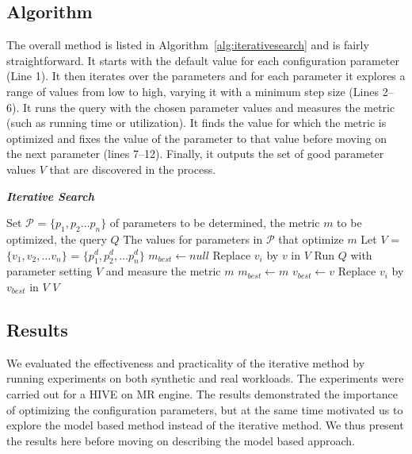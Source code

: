 \subsection{Algorithm}
The overall method is listed in Algorithm~\ref{alg:iterativesearch} and is fairly straightforward. It starts with the default value for each configuration parameter (Line 1). It then iterates over the parameters and for each parameter it explores a range of values from low to high, varying it with a minimum step size (Lines 2--6). It runs the query with the chosen parameter values and measures the metric (such as running time or utilization). It finds the value for which the metric is optimized and fixes the value of the parameter to that value before moving on the next parameter (lines 7--12). Finally, it outputs the set of good parameter values $V$ that are discovered in the process.
\renewcommand{\algorithmicrequire}{\textbf{Input:}}
\renewcommand{\algorithmicensure}{\textbf{Output:}}
\renewcommand{\algorithmiccomment}[1]{// #1}
\begin{algorithm}[h]
	\caption{\bf \textit{Iterative Search}}
	\label{alg:iterativesearch}
	\begin{algorithmic}[1]
		\footnotesize
		\REQUIRE Set $\mathcal{P}$ = $\{p_1, p_2 \ldots p_n\}$ of parameters to be determined, the metric $m$ to be optimized, the query $Q$
		\ENSURE The values for parameters in $\mathcal{P}$ that optimize $m$
		\STATE Let $V$ = $\{v_1, v_2, \ldots v_n\}$ = $\{p_1^d, p_2^d, \ldots p_n^d\}$
			\STATE $m_{best} \gets null$
				\STATE Replace $v_i$ by $v$ in $V$
				\STATE Run $Q$ with parameter setting $V$ and measure the metric $m$
					\STATE $m_{best} \gets m$
					\STATE $v_{best} \gets v$
				\ENDIF
			\ENDFOR
			\STATE Replace $v_i$ by $v_{best}$ in $V$ 			
		\ENDFOR
		\RETURN $V$
    \end{algorithmic}
\end{algorithm}
  
\subsection{Results}
We evaluated the effectiveness and practicality of the iterative method by running experiments on both synthetic and real workloads. The experiments were carried out for a HIVE on MR engine. The results demonstrated the importance of optimizing the configuration parameters, but at the same time motivated us to explore the model based method instead of the iterative method. We thus present the results here before moving on describing the model based approach.

